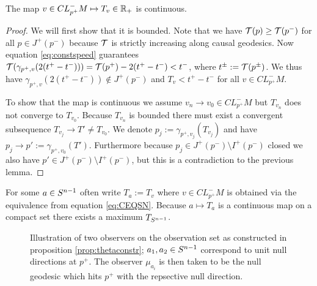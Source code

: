 \begin{lemma}
    The map $v\in CL^-_{p^+}M\mapsto T_v\in \mathbb{R}_+$ is continuous.
\end{lemma}
\begin{proof}
    We will first show that it is bounded. Note that we have ${\mathcal{T}}(p)\ge {\mathcal{T}}(p^-)$ for all $p\in J^+(p^-)$ because ${\mathcal{T}}$ is strictly increasing along causal geodesics. Now equation \ref{eq:constspeed} guarantees ${\mathcal{T}}(\gamma_{p^+,v}(2(t^+-t^-)))= {\mathcal{T}}(p^+)-2(t^+-t^-) < t^-$, where $t^\pm := {\mathcal{T}}(p^\pm)$. We thus have $\gamma_{p^+,v}(2(t^+-t^-))\notin J^+(p^-)$ and $T_v < t^+-t^-$ for all $v\in CL^-_{p^+}M$.

    To show that the map is continuous we assume $v_n \to v_0 \in CL^-_{p^+}M$ but $T_{v_n}$ does not converge to $T_{v_0}$. Because $T_{v_n}$ is bounded there must exist a convergent subsequence $T_{v_j}\to T'\neq T_{v_0}$. We denote $p_j:=\gamma_{p^+,v_j}(T_{v_j})$ and have $p_j\to p':=\gamma_{p^+,v_0}(T')$. Furthermore because $p_j\in J^+(p^-)\setminus I^+(p^-)$ closed we also have $p'\in J^+(p^-)\setminus I^+(p^-)$, but this is a contradiction to the previous lemma.
\end{proof}
For some $a\in {S^{n-1}}$ often write $T_a:=T_v$ where $v\in CL^-_{p^+}M$ is obtained via the equivalence from equation \ref{eq:CEQSN}. Because $a\mapsto T_a$ is a continuous map on a compact set there exists a maximum $T_{S^{n-1}}$.

\begin{figure}\label{fig:Observers}
    \centering
    
    \caption{Illustration of two observers on the observation set as constructed in proposition \ref{prop:thetaconstr}; $a_1,a_2\in {S^{n-1}}$ correspond to unit null directions at $p^+$. The observer $\mu_{a_i}$ is then taken to be the null geodesic which hits $p^+$ with the repsective null direction.}
\end{figure}

